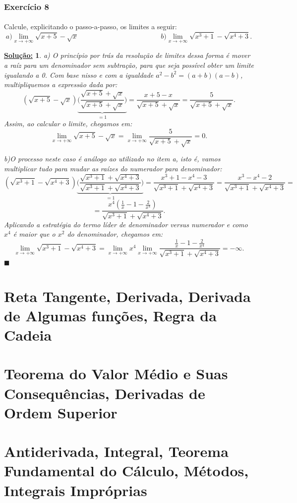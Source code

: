 \documentclass{article}
\newtheorem*{sol*}{\underline{Solu\c c\~ao:}}
\renewcommand\qedsymbol{$\blacksquare$}
\begin{document}
\subsubsection{Exerc\'icio 8} 
\paragraph{} Calcule, explicitando o passo-a-passo, os limites a seguir:
$$
a) \lim_{x\to+\infty} \sqrt{x + 5} - \sqrt{x} \hspace{5cm} b)\lim_{x\to+\infty} \sqrt{x^3 + 1} - \sqrt{x^4 + 3}.
$$
\begin{sol*}
a) O princ\'ipio por tr\'as da resolu\c c\~ao de limites dessa forma \'e mover a ra\'iz para um denominador sem subtra\c c\~ao, para que seja poss\'ivel obter um limite igualando a 0. Com base nisso e com a igualdade $a^2 - b^2 = (a + b)(a - b)$, multipliquemos a express\~ao dada por:
$$
(\sqrt{x + 5} - \sqrt{x})\underbrace{\biggl(\frac{\sqrt{x + 5} + \sqrt{x}}{\sqrt{x + 5} + \sqrt{x}}\biggr)}_{= 1} = \frac{x + 5 - x}{\sqrt{x + 5} + \sqrt{x}} = \frac{5}{\sqrt{x + 5} + \sqrt{x}}.
$$
Assim, ao calcular o limite, chegamos em:
$$
\lim_{x\to+\infty} \sqrt{x + 5} - \sqrt{x} = \lim_{x\to+\infty} \frac{5}{\sqrt{x + 5} + \sqrt{x}} = 0.
$$

b)O processo neste caso \'e an\'alogo ao utilizado no item a, isto \'e, vamos multiplicar tudo para mudar as ra\'izes do numerador para denominador:
$$
(\sqrt{x^3 + 1} - \sqrt{x^4 + 3})\underbrace{\biggl(\frac{\sqrt{x^3 + 1} + \sqrt{x^4 + 3}}{\sqrt{x^3 + 1} + \sqrt{x^4 + 3}}\biggr)}_{= 1} = \frac{x^3 + 1 - x^4 - 3}{\sqrt{x^3 + 1} + \sqrt{x^4 + 3}} = \frac{x^3 - x^4 - 2}{\sqrt{x^3 + 1} + \sqrt{x^4 + 3}} =
$$
$$
= \frac{x^4(\frac{1}{x} - 1 - \frac{2}{x^4})}{\sqrt{x^3 + 1} + \sqrt{x^4 + 3}}.
$$
Aplicando a estrat\'egia do termo l\'ider de denominador versus numerador e como $x^4$ \'e maior que o $x^2$ do denominador, chegamos em:
$$
\lim_{x\to+\infty} \sqrt{x^3 + 1} - \sqrt{x^4 + 3} = \lim_{x\to+\infty}x^4\lim_{x\to+\infty}\frac{\frac{1}{x} - 1 - \frac{2}{x^4}}{\sqrt{x^3 + 1} + \sqrt{x^4 + 3}} = -\infty.
$$
\qedsymbol
\end{sol*}

\newpage
\section{Reta Tangente, Derivada, Derivada de Algumas fun\c c\~oes, Regra da Cadeia}

\newpage
\section{Teorema do Valor M\'edio e Suas Consequ\^encias, Derivadas de Ordem Superior}

\newpage
\section{Antiderivada, Integral, Teorema Fundamental do C\'alculo, M\'etodos, Integrais Impr\'oprias}
\end{document}
